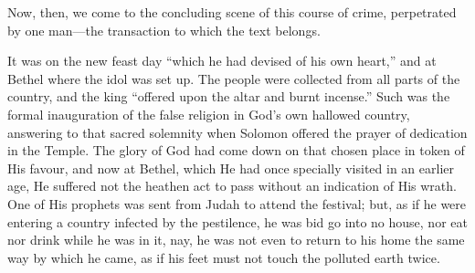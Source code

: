 Now, then, we come to the concluding scene of this course of crime,
perpetrated by one man—the transaction to which the text belongs.

It was on the new feast day ``which he had devised of his own
heart,'' and at Bethel where the idol was set up. The people were
collected from all parts of the country, and the king ``offered
upon the altar and burnt incense.'' Such was the formal
inauguration of the false religion in God's own hallowed country,
answering to that sacred solemnity when Solomon offered the prayer of
dedication in the Temple. The glory of God had come down on that
chosen place in token of His favour, and now at Bethel, which He had
once specially visited in an earlier age, He suffered not the heathen
act to pass without an indication of His wrath. One of His prophets
was sent from Judah to attend the festival; but, as if he were
entering a country infected by the pestilence, he was bid go into no
house, nor eat nor drink while he was in it, nay, he was not even to
return to his home the same way by which he came, as if his feet must
not touch the polluted earth twice.

